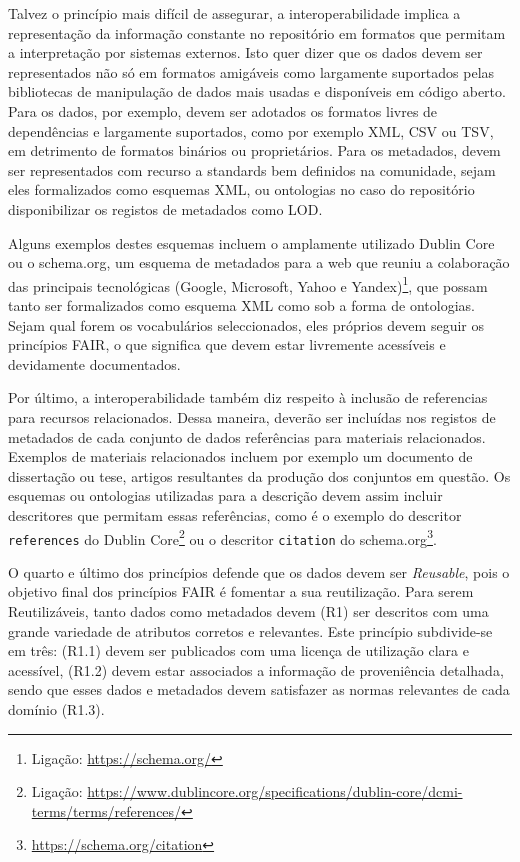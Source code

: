 \documentclass[sigconf,nonacm]{acmart}
\begin{document}
Talvez o princípio mais difícil de assegurar, a interoperabilidade implica a representação da informação constante no repositório em formatos que permitam a interpretação por sistemas externos. Isto quer dizer que os dados devem ser representados não só em formatos amigáveis como largamente suportados pelas bibliotecas de manipulação de dados mais usadas e disponíveis em código aberto. Para os dados, por exemplo, devem ser adotados os formatos livres de dependências e largamente suportados, como por exemplo \gls{XML}, \gls{CSV} ou \gls{TSV}, em detrimento de formatos binários ou proprietários. Para os metadados, devem ser representados com recurso a standards bem definidos na comunidade, sejam eles formalizados como esquemas XML, ou ontologias no caso do repositório disponibilizar os registos de metadados como \gls{LOD}.

Alguns exemplos destes esquemas incluem o amplamente utilizado Dublin Core ou o schema.org, um esquema de metadados para a web que reuniu a colaboração das principais tecnológicas (Google, Microsoft, Yahoo e Yandex)\footnote{Ligação: \url{https://schema.org/}}, que possam tanto ser formalizados como esquema \gls{XML} como sob a forma de ontologias. Sejam qual forem os vocabulários seleccionados, eles próprios devem seguir os princípios \gls{FAIR}, o que significa que devem estar livremente acessíveis e devidamente documentados.

Por último, a interoperabilidade também diz respeito à inclusão de referencias para recursos relacionados. Dessa maneira, deverão ser incluídas nos registos de metadados de cada conjunto de dados referências para materiais relacionados. Exemplos de materiais relacionados incluem por exemplo um documento de dissertação ou tese, artigos resultantes da produção dos conjuntos em questão. Os esquemas ou ontologias utilizadas para a descrição devem assim incluir descritores que permitam essas referências, como é o exemplo do descritor \texttt{references} do Dublin Core\footnote{Ligação: \url{https://www.dublincore.org/specifications/dublin-core/dcmi-terms/terms/references/}} ou o descritor \texttt{citation} do schema.org\footnote{\url{https://schema.org/citation}}.

O quarto e último dos princípios defende que os dados devem ser \textit{Reusable}, pois o objetivo final dos princípios \gls{FAIR} é fomentar a sua reutilização. Para serem Reutilizáveis, tanto dados como metadados devem (R1) ser descritos com uma grande variedade de atributos corretos e relevantes. Este princípio subdivide-se em três: (R1.1) devem ser publicados com uma licença de utilização clara e acessível, (R1.2) devem estar associados a informação de proveniência detalhada, sendo que esses dados e metadados devem satisfazer as normas relevantes de cada domínio (R1.3).
\end{document}

